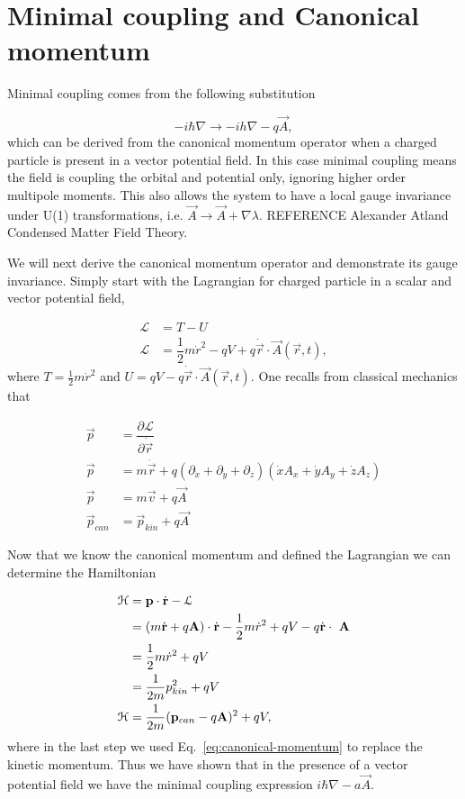 \section{Minimal coupling and Canonical momentum}
Minimal coupling comes from the following substitution

\begin{equation}
  -i\hbar\nabla \rightarrow -ih\nabla - q\vec{A},
\end{equation}
which can be derived from the canonical momentum operator when a charged particle is present in a vector potential field.
In this case minimal coupling means the field is coupling the orbital and potential only, ignoring higher order multipole moments.
This also allows the system to have a local gauge invariance under U(1) transformations, i.e. $\vec{A} \rightarrow \vec{A} + \nabla\lambda$.
REFERENCE Alexander Atland Condensed Matter Field Theory.

We will next derive the canonical momentum operator and demonstrate its gauge invariance.
Simply start with the Lagrangian for charged particle in a scalar and vector potential field,

\begin{align}
  \mathcal{L} &= T- U \nonumber \\
  \mathcal{L} &= \dfrac{1}{2} m \dot{r}^2 - qV + q \dot{\vec{r}} \cdot \vec{A}(\vec{r},t),
\end{align}
where $T = \tfrac{1}{2} m \dot{r}^2$ and $U = qV - q \dot{\vec{r}} \cdot \vec{A}(\vec{r},t)$.
One recalls from classical mechanics that

\begin{align}
  \vec{p} &= \dfrac{\partial\mathcal{L}}{\partial \dot{\vec{r}}} \nonumber \\
  \vec{p} &= m \dot{\vec{r}} + q \left( \partial_{\dot{x}} + \partial_{\dot{y}} + \partial_{\dot{z}} \right) \left(\dot{x} A_x + \dot{y} A_y + \dot{z} A_z \right) \nonumber \\
  \vec{p} &= m \vec{v} + q \vec{A} \nonumber \\
  \vec{p}_{can} &= \vec{p}_{kin} + q \vec{A}
  \label{eq:canonical-momentum}
\end{align}

Now that we know the canonical momentum and defined the Lagrangian we can determine the Hamiltonian

\begin{align}
  \mathcal{H} &= \mathbf{p} \cdot \dot{\mathbf{r}} - \mathcal{L} \nonumber \\
  &= (m \dot{\mathbf{r}} + q \mathbf{A}) \cdot \dot{\mathbf{r}} - \dfrac{1}{2} m \dot{r}^2 + q V - q \dot{\mathbf{r}}\cdot\ \mathbf{A} \nonumber \\
  &= \dfrac{1}{2} m \dot{r}^2 + q V \nonumber \\
  &= \dfrac{1}{2m}  p_{kin}^2 + q V \nonumber \\
  \mathcal{H} &= \dfrac{1}{2m} (\mathbf{p}_{can} - q \mathbf{A})^2 + q V,
\end{align}
where in the last step we used Eq.~\eqref{eq:canonical-momentum} to replace the kinetic momentum.
Thus we have shown that in the presence of a vector potential field we have the minimal coupling expression $i\hbar\nabla - a\vec{A}$.

